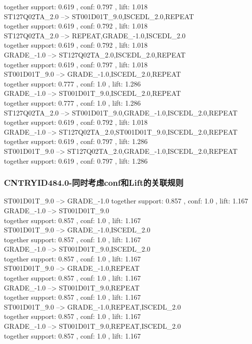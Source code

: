 \documentclass[12pt, a4paper, oneside]{ctexart}
\begin{document}
  together support: 0.619 , conf: 0.797 , lift: 1.018\\
ST127Q02TA\_2.0 --> ST001D01T\_9.0,ISCEDL\_2.0,REPEAT \\
  together support: 0.619 , conf: 0.792 , lift: 1.018\\
ST127Q02TA\_2.0 --> REPEAT,GRADE\_-1.0,ISCEDL\_2.0 \\
  together support: 0.619 , conf: 0.792 , lift: 1.018\\
GRADE\_-1.0 --> ST127Q02TA\_2.0,ISCEDL\_2.0,REPEAT \\
  together support: 0.619 , conf: 0.797 , lift: 1.018\\
ST001D01T\_9.0 --> GRADE\_-1.0,ISCEDL\_2.0,REPEAT \\
  together support: 0.777 , conf: 1.0 , lift: 1.286\\
GRADE\_-1.0 --> ST001D01T\_9.0,ISCEDL\_2.0,REPEAT \\
  together support: 0.777 , conf: 1.0 , lift: 1.286\\
ST127Q02TA\_2.0 --> ST001D01T\_9.0,GRADE\_-1.0,ISCEDL\_2.0,REPEAT \\
  together support: 0.619 , conf: 0.792 , lift: 1.018\\
GRADE\_-1.0 --> ST127Q02TA\_2.0,ST001D01T\_9.0,ISCEDL\_2.0,REPEAT \\
 together support: 0.619 , conf: 0.797 , lift: 1.286\\
ST001D01T\_9.0 --> ST127Q02TA\_2.0,GRADE\_-1.0,ISCEDL\_2.0,REPEAT \\
 together support: 0.619 , conf: 0.797 , lift: 1.286\\

\subsubsection{CNTRYID484.0-同时考虑conf和Lift的关联规则 } 
ST001D01T\_9.0 --> GRADE\_-1.0 
 together support: 0.857 , conf: 1.0 , lift: 1.167\\
GRADE\_-1.0 --> ST001D01T\_9.0 \\
 together support: 0.857 , conf: 1.0 , lift: 1.167\\
ST001D01T\_9.0 --> GRADE\_-1.0,ISCEDL\_2.0 \\
 together support: 0.857 , conf: 1.0 , lift: 1.167\\
GRADE\_-1.0 --> ST001D01T\_9.0,ISCEDL\_2.0 \\
 together support: 0.857 , conf: 1.0 , lift: 1.167\\
ST001D01T\_9.0 --> GRADE\_-1.0,REPEAT \\
 together support: 0.857 , conf: 1.0 , lift: 1.167\\
GRADE\_-1.0 --> ST001D01T\_9.0,REPEAT\\ 
 together support: 0.857 , conf: 1.0 , lift: 1.167\\
ST001D01T\_9.0 --> GRADE\_-1.0,REPEAT,ISCEDL\_2.0 \\
 together support: 0.857 , conf: 1.0 , lift: 1.167\\
GRADE\_-1.0 --> ST001D01T\_9.0,REPEAT,ISCEDL\_2.0 \\
 together support: 0.857 , conf: 1.0 , lift: 1.167\\
\end{document}

